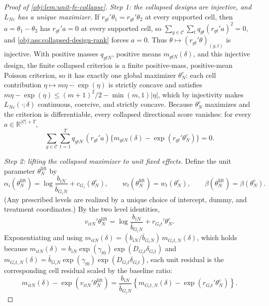 \documentclass[11pt]{article}
\begin{document}
\begin{proof}[Proof of \cref{obj:lem:unit-fe-collapse}]
\textit{Step 1: the collapsed designs are injective, and \(L_{Nc}\) has a unique maximizer.} If \(r_{gt}'\theta_1=r_{gt}'\theta_2\) at every supported cell, then \(a=\theta_1-\theta_2\) has \(r_{gt}'a=0\) at every supported cell, so \(\sum_{g\in\mathcal C}\sum_t q_{gt}(r_{gt}'a)^2=0\), and \cref{obj:ass:collapsed-design-rank} forces \(a=0\). Thus \(\theta\mapsto(r_{gt}'\theta)_{(g,t)}\) is injective.
With positive masses \(q_{gtN}\), positive means \(m_{gtN}(\delta)\), and this injective design, the finite collapsed criterion is a finite positive-mass, positive-mean Poisson criterion, so it has exactly one global maximizer \(\theta_N^c\): each cell contribution \(\eta\mapsto m\eta-\exp(\eta)\) is strictly concave and satisfies \(m\eta-\exp(\eta)\le (m+1)^2/2-\min(m,1)|\eta|\), which by injectivity makes \(L_{Nc}(\cdot;\delta)\) continuous, coercive, and strictly concave.
Because \(\theta_N^c\) maximizes and the criterion is differentiable, every collapsed directional score vanishes: for every \(a\in\mathbb R^{|\mathcal C|+T}\),
\[
\sum_{g\in\mathcal C}\sum_{t=1}^T
q_{gtN}\,(r_{gt}'a)\{m_{gtN}(\delta)-\exp(r_{gt}'\theta_N^c)\}=0 .
\]

\textit{Step 2: lifting the collapsed maximizer to unit fixed effects.} Define the unit parameter \(\theta_N^{\text{lift}}\) by
\[
\alpha_i(\theta_N^{\text{lift}})
=
\log\frac{b_{iN}}{\bar b_{G_iN}}+c_{G_i}(\theta_N^c),
\qquad
w_t(\theta_N^{\text{lift}})=w_t(\theta_N^c),
\qquad
\beta(\theta_N^{\text{lift}})=\beta(\theta_N^c).
\]
(Any prescribed levels are realized by a unique choice of intercept, dummy, and treatment coordinates.) By the two level identities,
\[
v_{itN}'\theta_N^{\text{lift}}
=
\log\frac{b_{iN}}{\bar b_{G_iN}}+r_{G_it}'\theta_N^c .
\]
Exponentiating and using \(m_{itN}(\delta)=(b_{iN}/\bar b_{G_iN})\,m_{G_it,N}(\delta)\), which holds because \(m_{itN}(\delta)=b_{iN}\exp(\gamma_{t0})\exp(D_{G_it}\delta_{G_it})\) and \(m_{G_it,N}(\delta)=\bar b_{G_iN}\exp(\gamma_{t0})\exp(D_{G_it}\delta_{G_it})\), each unit residual is the corresponding cell residual scaled by the baseline ratio:
\[
m_{itN}(\delta)-\exp(v_{itN}'\theta_N^{\text{lift}})
=
\frac{b_{iN}}{\bar b_{G_iN}}
\left\{m_{G_it,N}(\delta)-\exp(r_{G_it}'\theta_N^c)\right\}.
\]


\end{proof}
\end{document}
